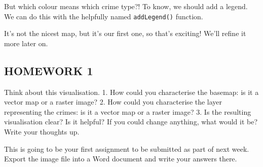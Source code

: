 \documentclass[]{book}
\newenvironment{Shaded}{\begin{snugshade}}{\end{snugshade}}
\newcommand{\CommentTok}[1]{\textcolor[rgb]{0.56,0.35,0.01}{\textit{#1}}}
\newcommand{\DataTypeTok}[1]{\textcolor[rgb]{0.13,0.29,0.53}{#1}}
\newcommand{\DecValTok}[1]{\textcolor[rgb]{0.00,0.00,0.81}{#1}}
\newcommand{\FloatTok}[1]{\textcolor[rgb]{0.00,0.00,0.81}{#1}}
\newcommand{\KeywordTok}[1]{\textcolor[rgb]{0.13,0.29,0.53}{\textbf{#1}}}
\newcommand{\NormalTok}[1]{#1}
\newcommand{\OperatorTok}[1]{\textcolor[rgb]{0.81,0.36,0.00}{\textbf{#1}}}
\newcommand{\StringTok}[1]{\textcolor[rgb]{0.31,0.60,0.02}{#1}}
\begin{document}
\hypertarget{htmlwidget-03220ede166911626713}{}

But which colour means which crime type?! To know, we should add a legend. We can do this with the helpfully named \texttt{addLegend()} function.

\begin{Shaded}
\end{Shaded}

\hypertarget{htmlwidget-13e6cf3c5d97a124f3c3}{}

It's not the nicest map, but it's our first one, so that's exciting! We'll refine it more later on.

\hypertarget{homework-1}{%
\subsection{HOMEWORK 1}\label{homework-1}}

Think about this visualisation.
1. How could you characterise the basemap: is it a vector map or a raster image?
2. How could you characterise the layer representing the crimes: is it a vector map or a raster image?
3. Is the resulting visualisation clear? Is it helpful? If you could change anything, what would it be? Write your thoughts up.

This is going to be your first assignment to be submitted as part of next week. Export the image file into a Word document and write your answers there.
\end{document}
